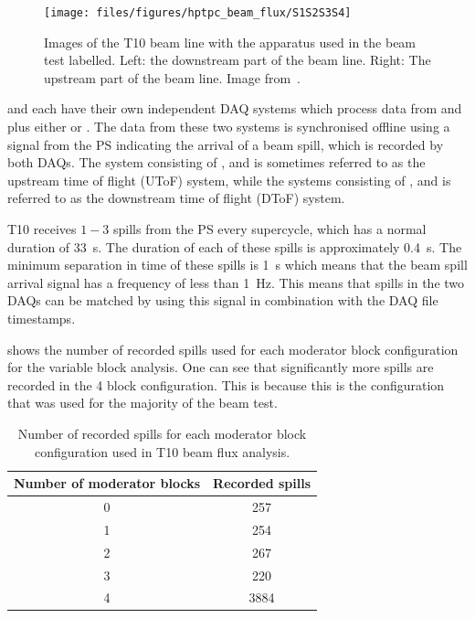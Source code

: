 \begin{figure}[h]
  \centering
  \texttt{[image: files/figures/hptpc\_beam\_flux/S1S2S3S4]}
  \caption[Images of the test beam setup with various objects labelled]{Images of the T10 beam line with the apparatus used in the beam test labelled. Left: the downstream part of the beam line. Right: The upstream part of the beam line. Image from~\cite{beampaper}.}
  \label{fig:beamlinePics}
\end{figure}

\SThree and \SFour each have their own independent DAQ systems which process data from \SOne and \STwo plus either \SThree or \SFour.
The data from these two systems is synchronised offline using a signal from the PS indicating the arrival of a beam spill, which is recorded by both DAQs.
The system consisting of \SOne, \STwo and \SThree is sometimes referred to as the upstream time of flight (UToF) system, while the systems consisting of \SOne, \STwo and \SFour is referred to as the downstream time of flight (DToF) system.

T10 receives $1-3$ spills from the PS every supercycle, which has a normal duration of \SI{33}{\second}.
The duration of each of these spills is approximately \SI{0.4}{\second}.
The minimum separation in time of these spills is \SI{1}{\second} which means that the beam spill arrival signal has a frequency of less than \SI{1}{\hertz}.
This means that spills in the two DAQs can be matched by using this signal in combination with the DAQ file timestamps.

 shows the number of recorded spills used for each moderator block configuration for the variable block analysis.
One can see that significantly more spills are recorded in the 4 block configuration.
This is because this is the configuration that was used for the majority of the beam test.

\begin{table}
  \centering
  \caption[Number of recorded spills for each moderator block configuration used in T10 beam flux analysis]{Number of recorded spills for each moderator block configuration used in T10 beam flux analysis.}
  \label{tab:nSpills}
  \begin{tabular}{c c}
    \hline
    \hline
    Number of moderator blocks & Recorded spills \\
    \hline
    0 & 257 \\
    1 & 254 \\
    2 & 267 \\
    3 & 220 \\
    4 & 3884 \\
    \hline
  \end{tabular}
\end{table}

